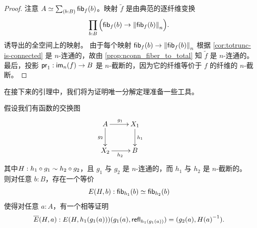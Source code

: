 \begin{proof}
注意 $A\eqvsym\sm{b:B}\hfib{f}b$。映射 $\tilde{f}$ 是由典范的逐纤维变换
\begin{equation*}
\prd{b:B} \Parens{\hfib{f}b\to\trunc n{\hfib{f}b}}.
\end{equation*}
诱导出的全空间上的映射。
由于每个映射 $\hfib{f}b\to\trunc n{\hfib{f}b}$ 根据 \cref{cor:totrunc-is-connected} 是 $n$-连通的，故由 \cref{prop:nconn_fiber_to_total} 知 $\tilde{f}$ 是 $n$-连通的。
最后，投影 $\proj1:\im_n(f) \to B$ 是 $n$-截断的，因为它的纤维等价于 $f$ 的纤维的 $n$-截断。
\end{proof}

在接下来的引理中，我们将为证明唯一分解定理准备一些工具。

\begin{lem}\label{prop:factor_equiv_fiber}
假设我们有函数的交换图
\begin{equation*}
  \xymatrix{
    {A} \ar[r]^{g_1} \ar[d]_{g_2} &
    {X_1} \ar[d]^{h_1} &
    \\
    {X_2} \ar[r]_{h_2}
    &
    {B}
  }
\end{equation*}
其中$H:h_1\circ g_1\htpy h_2\circ g_2$，且 $g_1$ 与 $g_2$ 是 $n$-连通的，而 $h_1$ 与 $h_2$ 是 $n$-截断的。
则对任意 $b:B$，存在一个等价
\begin{equation*}
E(H,b):\hfib{h_1}b\eqvsym\hfib{h_2}b
\end{equation*}
使得对任意 $a:A$，有一个相等证明
\[\overline{E}(H,a) :  E(H,h_1(g_1(a)))({g_1(a),\refl{h_1(g_1(a))}}) = \pairr{g_2(a),\opp{H(a)}}.\]
\end{lem}

